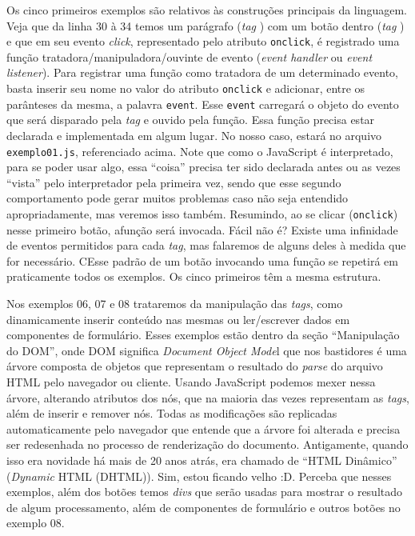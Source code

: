 Os cinco primeiros exemplos são relativos às construções principais da linguagem. Veja que da linha 30 à 34 temos um parágrafo (\textit{tag} ) com um botão dentro (\textit{tag} ) e que em seu evento \textit{click}, representado pelo atributo \texttt{onclick}, é registrado uma função tratadora/manipuladora/ouvinte de evento (\textit{event handler} ou \textit{event listener}). Para registrar uma função como tratadora de um determinado evento, basta inserir seu nome no valor do atributo \texttt{onclick} e adicionar, entre os parânteses da mesma, a palavra \texttt{event}. Esse \texttt{event} carregará o objeto do evento que será disparado pela \textit{tag} e ouvido pela função. Essa função precisa estar declarada e implementada em algum lugar. No nosso caso, estará no arquivo \texttt{exemplo01.js}, referenciado acima. Note que como o JavaScript é interpretado, para se poder usar algo, essa ``coisa'' precisa ter sido declarada antes ou as vezes ``vista'' pelo interpretador pela primeira vez, sendo que esse segundo comportamento pode gerar muitos problemas caso não seja entendido apropriadamente, mas veremos isso também. Resumindo, ao se clicar (\texttt{onclick}) nesse primeiro botão, afunção  será invocada. Fácil não é? Existe uma infinidade de eventos permitidos para cada \textit{tag}, mas falaremos de alguns deles à medida que for necessário. CEsse padrão de um botão invocando uma função se repetirá em praticamente todos os exemplos. Os cinco primeiros têm a mesma estrutura.

Nos exemplos 06, 07 e 08 trataremos da manipulação das \textit{tags}, como dinamicamente inserir conteúdo nas mesmas ou ler/escrever dados em componentes de formulário. Esses exemplos estão dentro da seção ``Manipulação do DOM'', onde DOM significa \textit{Document Object Mode}l que nos bastidores é uma árvore composta de objetos que representam o resultado do \textit{parse} do arquivo HTML pelo navegador ou cliente. Usando JavaScript podemos mexer nessa árvore, alterando atributos dos nós, que na maioria das vezes representam as \textit{tags}, além de inserir e remover nós. Todas as modificações são replicadas automaticamente pelo navegador que entende que a árvore foi alterada e precisa ser redesenhada no processo de renderização do documento. Antigamente, quando isso era novidade há mais de 20 anos atrás, era chamado de ``HTML Dinâmico'' (\textit{Dynamic} HTML (DHTML)). Sim, estou ficando velho :D. Perceba que nesses exemplos, além dos botões temos \textit{divs} que serão usadas para mostrar o resultado de algum processamento, além de componentes de formulário e outros botões no exemplo 08.

